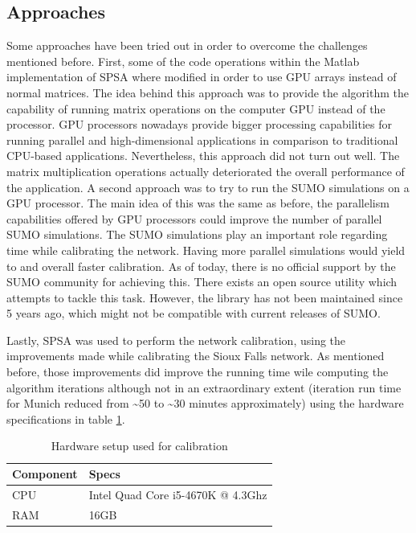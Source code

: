 \subsection{Approaches}
Some approaches have been tried out in order to overcome the challenges mentioned before. First, some of the code operations within the Matlab implementation of SPSA where modified in order to use GPU arrays instead of normal matrices. The idea behind this approach was to provide the algorithm the capability of running matrix operations on the computer GPU instead of the processor. GPU processors nowadays provide bigger processing capabilities for running parallel and high-dimensional applications in comparison to traditional CPU-based applications. Nevertheless, this approach did not turn out well. The matrix multiplication operations actually deteriorated the overall performance of the application. 
A second approach was to try to run the SUMO simulations on  a GPU processor. The main idea of this was the same as before, the parallelism capabilities offered by GPU processors could improve the number of parallel SUMO simulations. The SUMO simulations play an important role regarding time while calibrating the network. Having more parallel simulations would yield to and overall faster calibration. As of today, there is no official support by the SUMO community for achieving this. There exists an open source utility \parencite{sumo-cuda} which attempts to tackle this task. However, the library has not been maintained since 5 years ago, which might not be compatible with current releases of SUMO. 

Lastly, SPSA was used to perform the network calibration, using the improvements made while calibrating the Sioux Falls network. As mentioned before, those improvements did improve the running time wile computing the algorithm iterations although not in an extraordinary extent (iteration run time for Munich reduced from \textasciitilde50 to \textasciitilde30 minutes approximately) using the hardware specifications in table \ref{tab:hardware-setup}.

\begin{table}[htpb]
  \centering
  \begin{tabular}{l l}
    \toprule
      Component & Specs \\
    \midrule
      CPU & Intel Quad Core i5-4670K @ 4.3Ghz \\
      RAM & 16GB \\
    \bottomrule
  \end{tabular}
  \caption[Hardware Setup]{Hardware setup used for calibration}
  \label{tab:hardware-setup}
\end{table}

